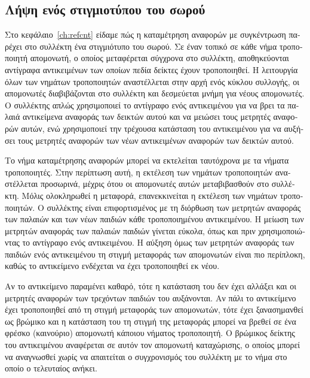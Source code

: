 \begin{greek}
\subsection{Λήψη ενός στιγμιοτύπου του σωρού}
Στο κεφάλαιο~\ref{ch:refcnt} είδαμε πώς η καταμέτρηση
αναφορών με συγκέντρωση παρέχει στο συλλέκτη ένα στιγμιότυπο
του σωρού. Σε έναν τοπικό σε κάθε νήμα τροποποιητή απομονωτή,
ο οποίος μεταφέρεται σύγχρονα στο συλλέκτη, αποθηκεύονται
αντίγραφα αντικειμένων των οποίων πεδία δείκτες έχουν
τροποποιηθεί. Η λειτουργία όλων των νημάτων τροποποιητών
αναστέλλεται στην αρχή ενός κύκλου συλλογής, οι απομονωτές
διαβιβάζονται στο συλλέκτη και δεσμεύεται μνήμη για νέους
απομονωτές. Ο συλλέκτης απλώς χρησιμοποιεί το αντίγραφο ενός
αντικειμένου για να βρει τα παλαιά αντικείμενα αναφοράς των
δεικτών αυτού και να μειώσει τους μετρητές αναφορών αυτών,
ενώ χρησιμοποιεί την τρέχουσα κατάσταση του αντικειμένου για
να αυξήσει τους μετρητές αναφορών των νέων αντικειμένων
αναφορών των δεικτών αυτού. 

Το νήμα καταμέτρησης αναφορών μπορεί να εκτελείται ταυτόχρονα
με τα νήματα τροποποιητές. Στην περίπτωση αυτή, η εκτέλεση
των νημάτων τροποποιητών αναστέλλεται προσωρινά, μέχρις ότου
οι απομονωτές αυτών μεταβιβασθούν στο συλλέκτη. Μόλις
ολοκληρωθεί η μεταφορά, επανεκκινείται η εκτέλεση των νημάτων
τροποποιητών. Ο συλλέκτης είναι επιφορτισμένος με τη διόρθωση
των μετρητών αναφοράς των παλαιών και των νέων παιδιών κάθε
τροποποιημένου αντικειμένου. Η μείωση των μετρητών αναφοράς των
παλαιών παιδιών γίνεται εύκολα, όπως και πριν χρησιμοποιώντας
το αντίγραφο ενός αντικειμένου. Η αύξηση όμως των μετρητών
αναφοράς των παιδιών ενός αντικειμένου τη στιγμή μεταφοράς των
απομονωτών είναι πιο περίπλοκη, καθώς το αντικείμενο ενδέχεται
να έχει τροποποιηθεί εκ νέου.

Αν το αντικείμενο παραμένει καθαρό, τότε η κατάσταση του δεν
έχει αλλάξει και οι μετρητές αναφορών των τρεχόντων παιδιών
του αυξάνονται. Αν πάλι το αντικείμενο έχει τροποποιηθεί από
τη στιγμή μεταφοράς των απομονωτών, τότε έχει ξανασημανθεί ως
βρώμικο και η κατάσταση του τη στιγμή της μεταφοράς μπορεί να
βρεθεί σε ένα φρέσκο (καινούριο) απομονωτή κάποιου νήματος
τροποποιητή. Ο βρώμικος δείκτης του αντικειμένου αναφέρεται
σε αυτόν τον απομονωτή καταχώρισης, ο οποίος μπορεί να
αναγνωσθεί χωρίς να απαιτείται ο συγχρονισμός του συλλέκτη
με το νήμα στο οποίο ο τελευταίος ανήκει.


\end{greek}
